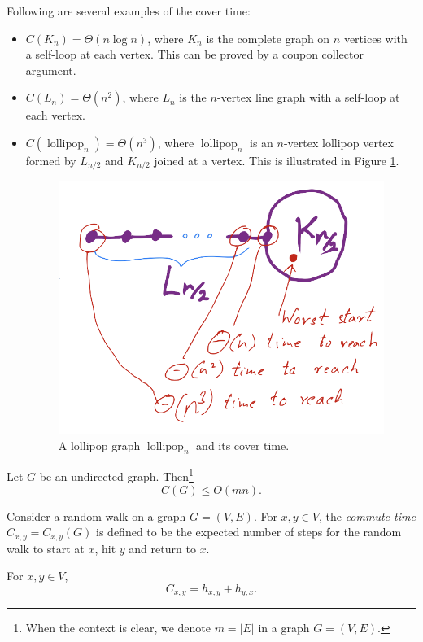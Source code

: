 \documentclass[letterpaper, reqno,11pt]{article}
\DeclareMathOperator{\lollipop}{lollipop}
\begin{document}
Following are several examples of the cover time:
\begin{itemize}[itemsep=0pt]
  \item $C(K_n) = \Theta(n \log n)$, where $K_n$ is the complete graph on $n$ vertices with a self-loop at each vertex. This can be proved by a coupon collector argument.
  \item $C(L_n) = \Theta(n^2)$, where $L_n$ is the $n$-vertex line graph with a self-loop at each vertex.
  \item $C(\lollipop_n) = \Theta(n^3)$, where $\lollipop_n$ is an $n$-vertex lollipop vertex formed by $L_{n/2}$ and $K_{n/2}$ joined at a vertex. This is illustrated in Figure \ref{fig:lollipop}.
  
  \begin{figure}[h]
    \centering
    \includegraphics[width=.6\textwidth]{figures/lollipop.png}
    \caption{A lollipop graph $\lollipop_n$ and its cover time.}
    \label{fig:lollipop}
  \end{figure}
\end{itemize}

\begin{theorem} \label{thm:cover}
  Let $G$ be an undirected graph. Then\footnote{When the context is clear, we denote $m = |E|$ in a graph $G = (V, E)$.}
  $$ C(G) \leq O(mn). $$
\end{theorem}

\begin{definition}
  Consider a random walk on a graph $G = (V, E)$. For $x, y \in V$, the \emph{commute time} $C_{x, y} = C_{x, y}(G)$ is defined to be the expected number of steps for the random walk to start at $x$, hit $y$ and return to $x$.
\end{definition}

\begin{proposition}
  For $x, y \in V$,
  $$ C_{x, y} = h_{x, y} + h_{y, x}. $$
\end{proposition}
\end{document}
